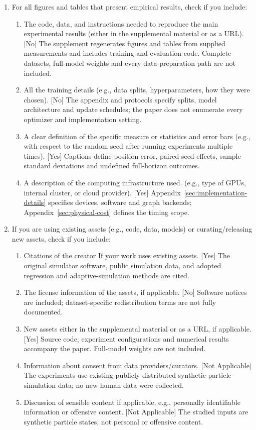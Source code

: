 \begin{enumerate}
  \item For all figures and tables that present empirical results, check if you include:
  \begin{enumerate}
    \item The code, data, and instructions needed to reproduce the main experimental results (either in the supplemental material or as a URL). [No] The supplement regenerates figures and tables from supplied measurements and includes training and evaluation code. Complete datasets, full-model weights and every data-preparation path are not included.
    \item All the training details (e.g., data splits, hyperparameters, how they were chosen). [No] The appendix and protocols specify splits, model architecture and update schedules; the paper does not enumerate every optimizer and implementation setting.
    \item A clear definition of the specific measure or statistics and error bars (e.g., with respect to the random seed after running experiments multiple times). [Yes] Captions define position error, paired seed effects, sample standard deviations and undefined full-horizon outcomes.
    \item A description of the computing infrastructure used. (e.g., type of GPUs, internal cluster, or cloud provider). [Yes] Appendix~\ref{sec:implementation-details} specifies devices, software and graph backends; Appendix~\ref{sec:physical-cost} defines the timing scope.
  \end{enumerate}

  \item If you are using existing assets (e.g., code, data, models) or curating/releasing new assets, check if you include:
  \begin{enumerate}
    \item Citations of the creator If your work uses existing assets. [Yes] The original simulator software, public simulation data, and adopted regression and adaptive-simulation methods are cited.
    \item The license information of the assets, if applicable. [No] Software notices are included; dataset-specific redistribution terms are not fully documented.
    \item New assets either in the supplemental material or as a URL, if applicable. [Yes] Source code, experiment configurations and numerical results accompany the paper. Full-model weights are not included.
    \item Information about consent from data providers/curators. [Not Applicable] The experiments use existing publicly distributed synthetic particle-simulation data; no new human data were collected.
    \item Discussion of sensible content if applicable, e.g., personally identifiable information or offensive content. [Not Applicable] The studied inputs are synthetic particle states, not personal or offensive content.
  \end{enumerate}


\end{enumerate}
